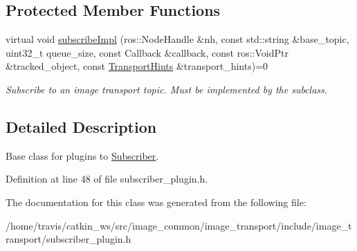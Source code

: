 \subsection*{Protected Member Functions}
\begin{DoxyCompactItemize}
\item 
\hypertarget{classimage__transport_1_1_subscriber_plugin_a1cc8b28b99ea0a15c9e58dc6d9bc27f6}{virtual void \hyperlink{classimage__transport_1_1_subscriber_plugin_a1cc8b28b99ea0a15c9e58dc6d9bc27f6}{subscribe\-Impl} (ros\-::\-Node\-Handle \&nh, const std\-::string \&base\-\_\-topic, uint32\-\_\-t queue\-\_\-size, const Callback \&callback, const ros\-::\-Void\-Ptr \&tracked\-\_\-object, const \hyperlink{classimage__transport_1_1_transport_hints}{Transport\-Hints} \&transport\-\_\-hints)=0}\label{classimage__transport_1_1_subscriber_plugin_a1cc8b28b99ea0a15c9e58dc6d9bc27f6}

\begin{DoxyCompactList}\small\item\em Subscribe to an image transport topic. Must be implemented by the subclass. \end{DoxyCompactList}\end{DoxyCompactItemize}


\subsection{Detailed Description}
Base class for plugins to \hyperlink{classimage__transport_1_1_subscriber}{Subscriber}. 

Definition at line 48 of file subscriber\-\_\-plugin.\-h.



The documentation for this class was generated from the following file\-:\begin{DoxyCompactItemize}
\item 
/home/travis/catkin\-\_\-ws/src/image\-\_\-common/image\-\_\-transport/include/image\-\_\-transport/subscriber\-\_\-plugin.\-h\end{DoxyCompactItemize}
